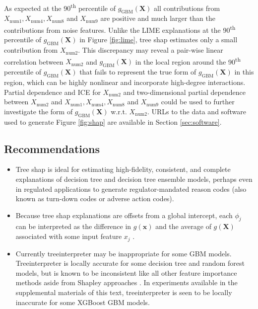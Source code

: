 \documentclass[sigconf, review]{acmart}
\begin{document}
As expected at the 90\textsuperscript{th} percentile of $g_{\text{GBM}}(\mathbf{X})$ all contributions from $X_{\text{num}1}, X_{\text{num}4}, X_{\text{num}8}$ and $X_{\text{num}9}$ are positive and much larger than the contributions from noise features. Unlike the LIME explanations at the 90\textsuperscript{th} percentile of $g_{\text{GBM}}(\mathbf{X})$ in Figure \ref{fig:lime}, tree shap estimates only a small contribution from $X_{\text{num}2}$. This discrepancy may reveal a pair-wise linear correlation between $X_{\text{num}2}$ and $g_{\text{GBM}}(\mathbf{X})$ in the local region around the 90\textsuperscript{th} percentile of $g_{\text{GBM}}(\mathbf{X})$ that fails to represent the true form of $g_{\text{GBM}}(\mathbf{X})$ in this region, which can be highly nonlinear and incorporate high-degree interactions. Partial dependence and ICE for $X_{\text{num}2}$ and two-dimensional partial dependence between $X_{\text{num}2}$ and $X_{\text{num}1}, X_{\text{num}4}, X_{\text{num}8}$ and $X_{\text{num}9}$ could be used to further investigate the form of $g_{\text{GBM}}(\mathbf{X})$ w.r.t. $X_{\text{num}2}$. URLs to the data and software used to generate Figure \ref{fig:shap} are available in Section \ref{sec:software}.

\subsection{Recommendations}

\begin{itemize}
	
	\item Tree shap is ideal for estimating high-fidelity, consistent, and complete explanations of decision tree and decision tree ensemble models, perhaps even in regulated applications to generate regulator-mandated reason codes (also known as turn-down codes or adverse action codes).
	
	\item Because tree shap explanations are offsets from a global intercept, each $\phi_j$ can be interpreted as the difference in $g(\mathbf{x})$ and the average of $g(\mathbf{X})$ associated with some input feature $x_j$ \cite{molnar}. 
		
	\item Currently treeinterpreter may be inappropriate for some GBM models. Treeinterpreter is locally accurate for some decision tree and random forest models, but is known to be inconsistent like all other feature importance methods aside from Shapley approaches \cite{tree_shap}. In experiments available in the supplemental materials of this text, treeinterpreter is seen to be locally inaccurate for some XGBoost GBM models. 
	
\end{itemize}
\end{document}
